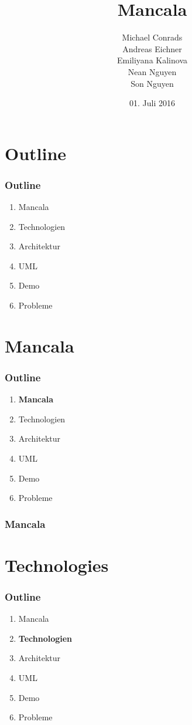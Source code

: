 \documentclass[
	10pt,
	t		%
]{beamer}
\title{Mancala}
\subtitle{}
\author{Michael Conrads \\ Andreas Eichner \\ Emiliyana Kalinova \\ Nean Nguyen \\ Son Nguyen}
\date{01. Juli 2016}
\begin{document}
\AddToShipoutPicture{\TitlePicture}
\maketitle
\ClearShipoutPicture
\AddToShipoutPicture{\BackgroundPicture}

\section{Outline}
\begin{frame}
\frametitle{Outline}
\begin{enumerate}
\item Mancala
\item Technologien
\item Architektur
\item UML
\item Demo
\item Probleme
\end{enumerate}
\end{frame}

\section{Mancala}
\begin{frame}
\frametitle{Outline}
\begin{enumerate}
\item \textbf{Mancala}
\item Technologien
\item Architektur
\item UML
\item Demo
\item Probleme
\end{enumerate}
\end{frame}

\begin{frame}
\frametitle{Mancala}

\end{frame}

\section{Technologies}
\begin{frame}
\frametitle{Outline}
\begin{enumerate}
\item Mancala
\item \textbf{Technologien}
\item Architektur
\item UML
\item Demo
\item Probleme
\end{enumerate}
\end{frame}
\end{document}
